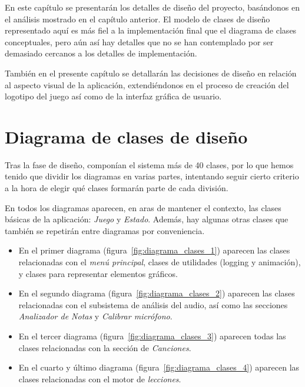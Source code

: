 En este capítulo se presentarán los detalles de diseño del proyecto, basándonos
en el análisis mostrado en el capítulo anterior. El modelo de clases de diseño
representado aquí es más fiel a la implementación final que el diagrama de
clases conceptuales, pero aún así hay detalles que no se han contemplado por ser
demasiado cercanos a los detalles de implementación.

También en el presente capítulo se detallarán las decisiones de diseño en
relación al aspecto visual de la aplicación, extendiéndonos en el proceso de
creación del logotipo del juego así como de la interfaz gráfica de usuario.

\section{Diagrama de clases de diseño}

Tras la fase de diseño, componían el sistema más de 40 clases, por lo que hemos
tenido que dividir los diagramas en varias partes, intentando seguir cierto
criterio a la hora de elegir qué clases formarán parte de cada división.

En todos los diagramas aparecen, en aras de mantener el contexto, las clases
básicas de la aplicación: \textit{Juego} y \textit{Estado}. Además, hay algunas
otras clases que también se repetirán entre diagramas por conveniencia.

\begin{itemize}
\item En el primer diagrama (figura~\ref{fig:diagrama_clases_1}) aparecen las clases
  relacionadas con el \textit{menú principal}, clases de utilidades (logging y
  animación), y clases para representar elementos gráficos.
\item En el segundo diagrama (figura~\ref{fig:diagrama_clases_2}) aparecen las
  clases relacionadas con el subsistema de análisis del audio, así como las
  secciones \textit{Analizador de Notas} y \textit{Calibrar micrófono}.
\item En el tercer diagrama (figura~\ref{fig:diagrama_clases_3}) aparecen todas las
  clases relacionadas con la sección de \textit{Canciones}.
\item En el cuarto y último diagrama (figura~\ref{fig:diagrama_clases_4}) aparecen
  las clases relacionadas con el motor de \textit{lecciones}.
\end{itemize}

